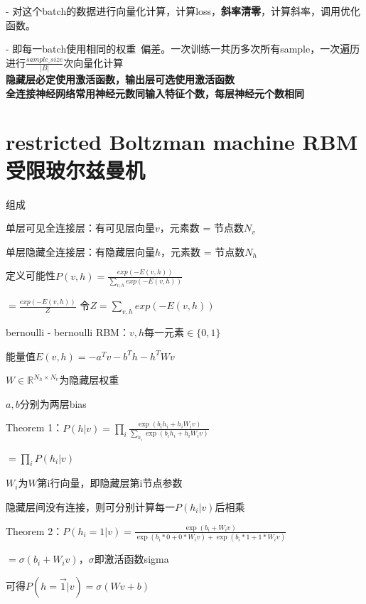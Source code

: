 \documentclass[UTF8]{ctexart}
\begin{document}
  - 对这个batch的数据进行向量化计算，计算loss，\textbf{斜率清零}，计算斜率，调用优化函数。

  - 即每一batch使用相同的权重\ 偏差。一次训练一共历多次所有sample，一次遍历进行$\frac{sample\_size}{|B|}$次向量化计算\\
\textbf{隐藏层必定使用激活函数，输出层可选使用激活函数}\\
\textbf{全连接神经网络常用神经元数同输入特征个数，每层神经元个数相同}


\section{restricted Boltzman machine RBM 受限玻尔兹曼机}
\noindent 组成

  单层可见全连接层：有可见层向量$v$，元素数 = 节点数$N_v$
  
  单层隐藏全连接层：有隐藏层向量$h$，元素数 = 节点数$N_h$

  定义可能性$P(v, h) = \frac{exp(-E(v, h))}{\sum_{v, h}exp(-E(v, h))}$

  \quad $ = \frac{exp(-E(v, h))}{Z}$ 令$Z = \sum_{v, h}exp(-E(v, h))$
  
  bernoulli - bernoulli RBM：$v, h$每一元素$\in \{0, 1\}$

  \quad 能量值$E(v, h) = -a^Tv - b^Th - h^TWv$

  \quad \quad $W \in \mathbb{R}^{N_h \times N_v}$为隐藏层权重

  \quad \quad $a, b$分别为两层bias

  \quad Theorem 1：$P(h | v) = \prod_i \frac{\exp(b_ih_i + h_iW_{i}v)}{\sum_{h_i}\exp(b_ih_i + h_iW_iv)}$
  
  \quad \quad $ = \prod_i P(h_i | v)$

  \quad \quad $W_i$为$W$第i行向量，即隐藏层第i节点参数

  \quad \quad 隐藏层间没有连接，则可分别计算每一$P(h_i | v)$后相乘

  \quad Theorem 2：$P(h_i = 1 | v) = \frac{\exp(b_i + W_{i}v)}{\exp(b_i * 0 + 0 * W_iv) + \exp(b_i * 1 + 1 * W_iv)}$

  \quad \quad $ = \sigma(b_i + W_{i}v)$，$\sigma$即激活函数sigma

  \quad \quad 可得$P(h = \vec{1} | v) = \sigma(Wv + b)$
\end{document}
